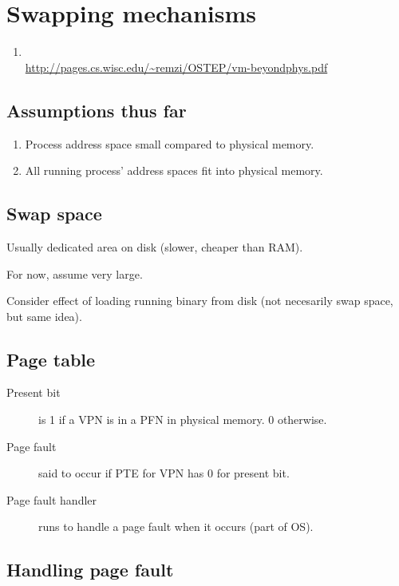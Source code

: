 \chapter{Swapping mechanisms}
\label{ch:swapping-mechanisms}

\begin{reading}
  \begin{enumerate}
  \item
    \citet[Chapter 21]{arpaci-dusseau:2015:operating}\\
    \url{http://pages.cs.wisc.edu/~remzi/OSTEP/vm-beyondphys.pdf}
  \end{enumerate}
\end{reading}

\section{Assumptions thus far}

\begin{enumerate}
\item Process address space small compared to physical memory.
\item All running process' address spaces fit into physical memory.
\end{enumerate}

\section{Swap space}

Usually dedicated area on disk (slower, cheaper than RAM).

For now, assume very large.

Consider effect of loading running binary from disk (not necesarily swap space, but same idea).

\section{Page table}

\begin{description}
\item[Present bit] is 1 if a VPN is in a PFN in physical memory. 0 otherwise.
\item[Page fault] said to occur if PTE for VPN has 0 for present bit.
\item[Page fault handler] runs to handle a page fault when it occurs (part of OS).
\end{description}

\section{Handling page fault}

